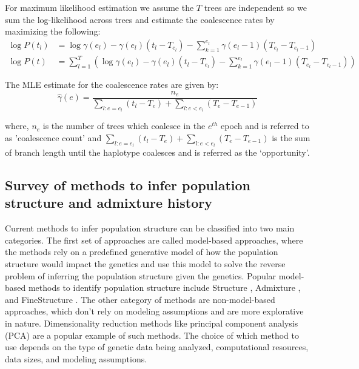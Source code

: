 For maximum likelihood estimation we assume the $T$ trees are independent so we sum the log-likelihood across trees and estimate the coalescence rates by maximizing the following:
\begin{align}
    \log P(t_l) &= \log \gamma(e_l)  -\gamma(e_l) (t_l - T_{e_l}) - \sum_{k=1}^{e_l} \gamma(e_l - 1) (T_{e_l} - T_{e_l-1}) \nonumber \\
    \log P(t) &= \sum_{l=1}^{T} \left( \log \gamma(e_l)  -\gamma(e_l) (t_l - T_{e_l}) - \sum_{k=1}^{e_l} \gamma(e_l - 1) (T_{e_l} - T_{e_l-1}) \right)
\end{align}

The MLE estimate for the coalescence rates are given by: 
\begin{equation}
    \hat{\gamma}(e) = \frac{n_e}{\sum_{l:e=e_l} (t_l - T_e) +  \sum_{l:e<e_l} (T_e - T_{e-1})}
\end{equation}

where, $n_e$ is the number of trees which coalesce in the $e^{th}$ epoch and is referred to as 'coalescence count' and $\sum_{l:e=e_l} (t_l - T_e) +  \sum_{l:e<e_l} (T_e - T_{e-1})$ is the sum of branch length until the haplotype coalesces and is referred as the `opportunity'. 

\subsection{Survey of methods to infer population structure and admixture history}
\label{sec:ch1-gb-survey}
Current methods to infer population structure can be classified into two main categories. The first set of approaches are called model-based approaches, where the methods rely on a predefined generative model of how the population structure would impact the genetics and use this model to solve the reverse problem of inferring the population structure given the genetics. Popular model-based methods to identify population structure include Structure \cite{Pritchard2000}, Admixture \cite{Alexander2009}, and FineStructure \cite{Lawson2012}. The other category of methods are non-model-based approaches, which don't rely on modeling assumptions and are more explorative in nature. Dimensionality reduction methods like principal component analysis (PCA) are a popular example of such methods. The choice of which method to use depends on the type of genetic data being analyzed, computational resources, data sizes, and modeling assumptions.

